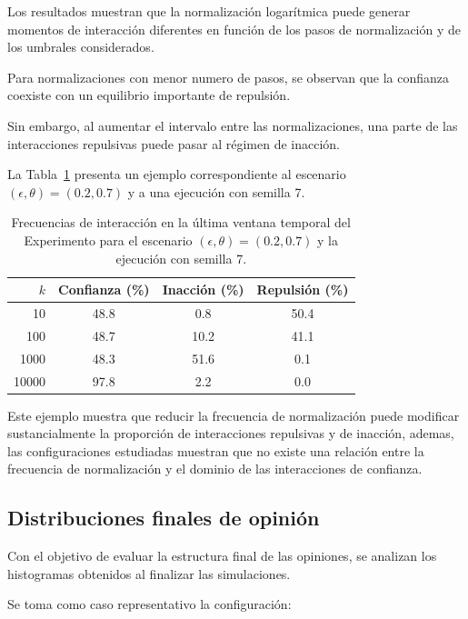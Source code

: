 \documentclass[11pt,a4paper]{article}
\begin{document}
Los resultados muestran que la normalización logarítmica puede generar momentos de interacción diferentes en función de los pasos de normalización y de los umbrales considerados.

Para normalizaciones con menor numero de pasos, se observan que la confianza coexiste con un equilibrio importante de repulsión.

Sin embargo, al aumentar el intervalo entre las normalizaciones, una parte de las interacciones repulsivas puede pasar al régimen de inacción.

La Tabla~\ref{tab:exp05_interacciones} presenta un ejemplo correspondiente al escenario $(\epsilon,\theta)=(0.2,0.7)$ y a una ejecución con semilla 7.

\begin{table}[htbp]
    \centering
    \caption{Frecuencias de interacción en la última ventana temporal del Experimento para el escenario $(\epsilon,\theta)=(0.2,0.7)$ y la ejecución con semilla 7.}
    \label{tab:exp05_interacciones}

    \begin{tabular}{rccc}
        \hline
        $k$ &
        Confianza (\%) &
        Inacción (\%) &
        Repulsión (\%) \\
        \hline
        10    & 48.8 & 0.8  & 50.4 \\
        100   & 48.7 & 10.2 & 41.1 \\
        1000  & 48.3 & 51.6 & 0.1 \\
        10000 & 97.8 & 2.2  & 0.0 \\
        \hline
    \end{tabular}
\end{table}

Este ejemplo muestra que reducir la frecuencia de normalización puede modificar sustancialmente la proporción de interacciones repulsivas y de inacción, ademas, las configuraciones estudiadas muestran que no existe una relación entre la frecuencia de normalización y el dominio de las interacciones de confianza.

\subsection{Distribuciones finales de opinión}
\label{subsec:exp05_distribuciones}

Con el objetivo de evaluar la estructura final de las opiniones, se analizan los histogramas obtenidos al finalizar las simulaciones.

Se toma como caso representativo la configuración:
\end{document}
